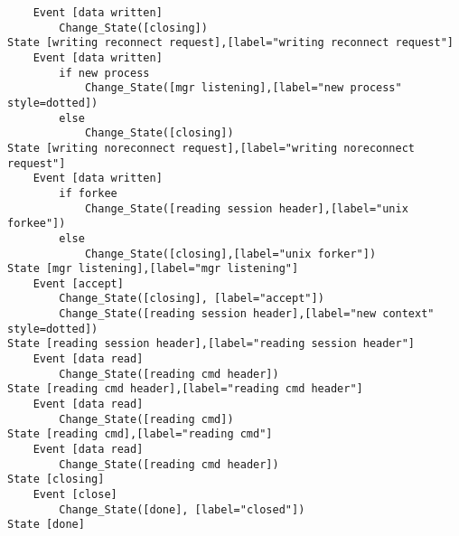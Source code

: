 \begin{verbatim}
	Event [data written]
		Change_State([closing])
State [writing reconnect request],[label="writing reconnect request"]
	Event [data written]
		if new process
			Change_State([mgr listening],[label="new process" style=dotted])
		else
			Change_State([closing])
State [writing noreconnect request],[label="writing noreconnect request"]
	Event [data written]
		if forkee
			Change_State([reading session header],[label="unix forkee"])
		else
			Change_State([closing],[label="unix forker"])
State [mgr listening],[label="mgr listening"]
	Event [accept]
		Change_State([closing], [label="accept"])
		Change_State([reading session header],[label="new context" style=dotted])
State [reading session header],[label="reading session header"]
	Event [data read]
		Change_State([reading cmd header])
State [reading cmd header],[label="reading cmd header"]
	Event [data read]
		Change_State([reading cmd])
State [reading cmd],[label="reading cmd"]
	Event [data read]
		Change_State([reading cmd header])
State [closing]
	Event [close]
		Change_State([done], [label="closed"])
State [done]
\end{verbatim}
